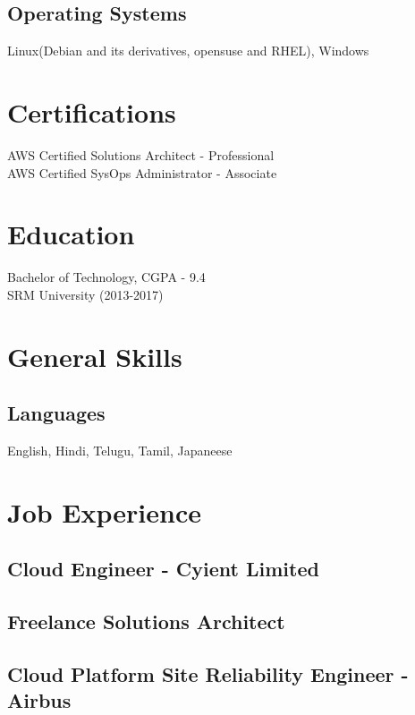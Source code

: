 \documentclass{article}
\begin{document}
    \subsection{Operating Systems}
    Linux(Debian and its derivatives, opensuse and RHEL), Windows


    \section{Certifications}
    AWS Certified Solutions Architect - Professional \\
    AWS Certified SysOps Administrator - Associate


    \section{Education} 
    Bachelor of Technology, CGPA - 9.4 \\
    SRM University (2013-2017)


    \section{General Skills}
    \subsection{Languages}
    English, Hindi, Telugu, Tamil, Japaneese


    \section{Job Experience}
    \subsection{Cloud Engineer - Cyient Limited}
    \subsection{Freelance Solutions Architect}
    \subsection{Cloud Platform Site Reliability Engineer - Airbus}
\end{document}
